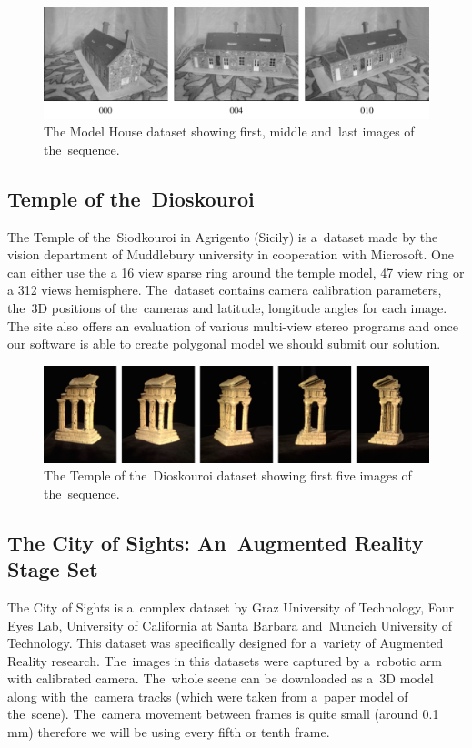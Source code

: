 \begin{figure}[ht]
	\begin{center}
		\includegraphics[keepaspectratio,width=\textwidth]{fig/experiments-model-house.pdf}
	\end{center}
	\caption{The Model House dataset showing first, middle and~last images of the~sequence.}
	\label{fig:modelhouse}
\end{figure}

\subsection*{Temple of the~Dioskouroi}
The Temple of the~Siodkouroi in Agrigento (Sicily) is a~dataset made by the vision department of Muddlebury university in cooperation with Microsoft. One can either use the a 16 view sparse ring around the temple model, 47 view ring or a 312 views hemisphere. The~dataset contains camera calibration parameters, the~3D positions of the~cameras and latitude, longitude angles for each image. The site also offers an evaluation of various multi-view stereo programs and once our software is able to create polygonal model we should submit our solution. \cite{dataset-temple}

\begin{figure}[ht]
	\begin{center}
		\includegraphics[keepaspectratio,width=\textwidth]{fig/experiments-temple.pdf}
	\end{center}
	\caption{The Temple of the~Dioskouroi dataset showing first five images of the~sequence.}
	\label{fig:temple}
\end{figure}

\subsection*{The City of Sights: An~Augmented Reality Stage Set}
The City of Sights \cite{cityofsights_ISMAR2010} is a~complex dataset by Graz University of Technology, Four Eyes Lab, University of California at Santa Barbara and~Muncich University of Technology. This dataset was specifically designed for a~variety of Augmented Reality research. The~images in this datasets were captured by a~robotic arm with calibrated camera. The~whole scene can be downloaded as a~3D model along with the~camera tracks (which were taken from a~paper model of the~scene). The~camera movement between frames is quite small (around 0.1 mm) therefore we will be using every fifth or tenth frame.

